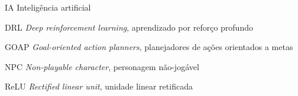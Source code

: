 \documentclass[
	12pt,				%
	openright,			%
	oneside,			%
	a4paper,			%
	brazil				%
	]{abntex2}
\begin{document}
\frenchspacing 

\imprimircapa
\imprimirfolhaderosto*

%

%
%
%


\tableofcontents*
\cleardoublepage
\listoffigures*
\cleardoublepage
\listoftables*
\cleardoublepage
\begin{siglas}
  \item[IA] Inteligência artificial
  \item[DRL] \textit{Deep reinforcement learning}, aprendizado por reforço profundo
  \item[GOAP] \textit{Goal-oriented action planners}, planejadores de ações orientados a metas
  \item[NPC] \textit{Non-playable character}, personagem não-jogável
  \item[ReLU] \textit{Rectified linear unit}, unidade linear retificada 
\end{siglas}
\end{document}
